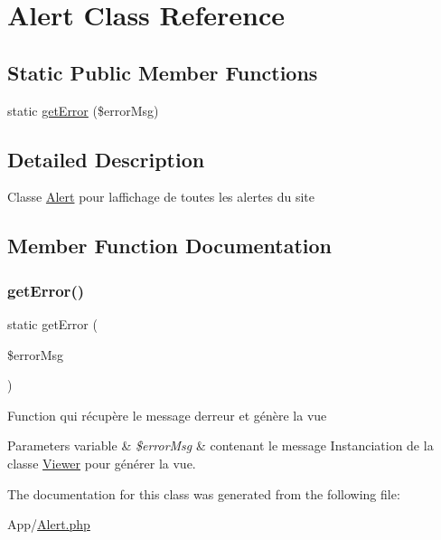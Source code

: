 \hypertarget{class_app_1_1_alert}{}\section{Alert Class Reference}
\label{class_app_1_1_alert}
\subsection*{Static Public Member Functions}
\begin{DoxyCompactItemize}
\item 
static \hyperlink{class_app_1_1_alert_a9e9e1b0e1f542b18ea01e9f132a278e2}{get\+Error} (\$error\+Msg)
\end{DoxyCompactItemize}


\subsection{Detailed Description}
Classe \hyperlink{class_app_1_1_alert}{Alert} pour l\textquotesingle{}affichage de toutes les alertes du site 

\subsection{Member Function Documentation}
\mbox{\label{class_app_1_1_alert_a9e9e1b0e1f542b18ea01e9f132a278e2}} 
\subsubsection{\texorpdfstring{get\+Error()}{getError()}}
{\footnotesize\ttfamily static get\+Error (\begin{DoxyParamCaption}\item[{}]{\$error\+Msg }\end{DoxyParamCaption})\hspace{0.3cm}{\ttfamily [static]}}

Function qui récupère le message d\textquotesingle{}erreur et génère la vue 
\begin{DoxyParams}[1]{Parameters}
variable & {\em \$error\+Msg} & contenant le message Instanciation de la classe \hyperlink{class_app_1_1_viewer}{Viewer} pour générer la vue. \\
\hline
\end{DoxyParams}


The documentation for this class was generated from the following file\+:\begin{DoxyCompactItemize}
\item 
App/\hyperlink{_alert_8php}{Alert.\+php}\end{DoxyCompactItemize}
